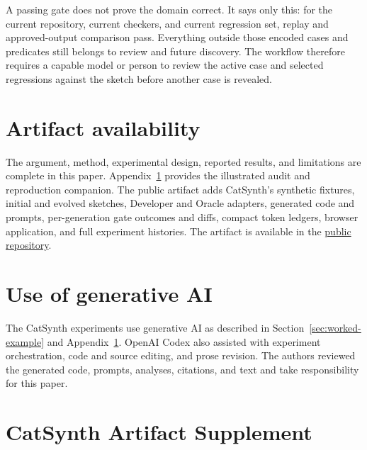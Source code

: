\documentclass[11pt]{article}
\begin{document}
A passing gate does not prove the domain correct.  It says only this: for the current repository,
current checkers, and current regression set, replay and approved-output comparison pass.  Everything
outside those encoded cases and predicates still belongs to review and future discovery.  The
workflow therefore requires a capable model or person to review the active case and selected
regressions against the sketch before another case is revealed.

\section*{Artifact availability}

The argument, method, experimental design, reported results, and limitations are complete in
this paper.  Appendix~\ref{app:catsynth-supplement} provides the illustrated audit and
reproduction companion.  The public artifact adds CatSynth's synthetic fixtures, initial and
evolved sketches, Developer and Oracle adapters, generated code and prompts, per-generation gate
outcomes and diffs, compact token ledgers, browser application, and full experiment histories.
The artifact is available in the
\href{https://github.com/open-horizon-labs/counterexample-supplemented-sketches}{public repository}.

\section*{Use of generative AI}

The CatSynth experiments use generative AI as described in
Section~\ref{sec:worked-example} and Appendix~\ref{app:catsynth-supplement}.  OpenAI Codex also
assisted with experiment orchestration, code and source editing, and prose revision.  The
authors reviewed the generated code, prompts, analyses, citations, and text and take
responsibility for this paper.


\small


\normalsize
\clearpage
\appendix
\section{CatSynth Artifact Supplement}
\label{app:catsynth-supplement}

\begingroup
\let\section\subsection
\let\subsection\subsubsection

\endgroup
\end{document}
